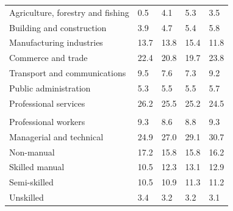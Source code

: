 \documentclass{article}
\begin{document}
\begin{table}[h]
\begin{tabular}{KTTTT}
    \hline
Agriculture, forestry and fishing  & 0.5& 4.1& 5.3& 3.5\\
Building and construction & 3.9& 4.7& 5.4& 5.8\\
Manufacturing industries & 13.7& 13.8& 15.4& 11.8\\
Commerce and trade  & 22.4& 20.8& 19.7& 23.8\\
Transport and communications  & 9.5& 7.6& 7.3& 9.2\\
Public administration & 5.3& 5.5& 5.5& 5.7\\
Professional services & 26.2& 25.5& 25.2& 24.5\\
\hline
    \\ 
    \hline
Professional workers  & 9.3& 8.6 & 8.8& 9.3\\
Managerial and technical & 24.9& 27.0& 29.1& 30.7\\
Non-manual & 17.2& 15.8& 15.8& 16.2\\
Skilled manual & 10.5& 12.3& 13.1& 12.9\\
Semi-skilled & 10.5& 10.9& 11.3& 11.2\\
Unskilled  & 3.4& 3.2& 3.2& 3.1\\
\end{tabular}
\end{table}
\pagebreak
\end{document}
